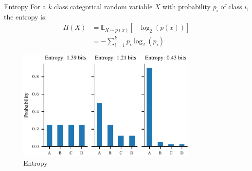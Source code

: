 \documentclass[handout]{beamer}
\begin{document}
\begin{frame}{Entropy}
    For a $k$ class categorical random variable $X$ with probability $p_i$ of class $i$, the entropy is:
    \begin{align*}
        H(X) &= \mathbb{E}_{X \sim p(x)}[-\log_2(p(x))] \\
        &= -\sum_{i=1}^k p_i \log_2(p_i)
    \end{align*}

    \begin{figure}
        \centering
        \includegraphics[width=0.8\textwidth]{notebooks/figures/information-theory/categorical-entropy.pdf}
        \caption{Entropy}
        \label{fig:entropy_categorical}
    \end{figure}
    
\end{frame}
\end{document}
